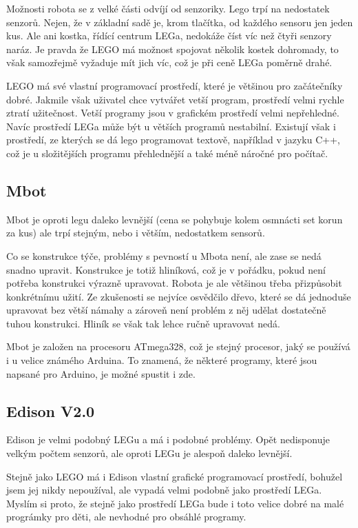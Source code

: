 \documentclass{template/socthesis}
\begin{document}
Možnosti robota se z velké části odvíjí od senzoriky. Lego trpí na nedostatek senzorů. Nejen, že v základní sadě je, krom tlačítka, od každého sensoru jen jeden kus. Ale ani kostka, řídící centrum LEGa, nedokáže číst víc než čtyři senzory naráz. Je pravda že LEGO má možnost spojovat několik kostek dohromady, to však samozřejmě vyžaduje mít jich víc, což je při ceně LEGa poměrně drahé.


LEGO má své vlastní programovací prostředí, které je většinou pro začátečníky dobré. Jakmile však uživatel chce vytvářet vetší program, prostředí velmi rychle ztratí užitečnost. Vetší programy jsou v grafickém prostředí velmi nepřehledné. Navíc prostředí LEGa může být u větších programů nestabilní. Existují však i prostředí, ze kterých se dá lego programovat textově, například v jazyku C++, což je u složitějších programu přehlednější a také méně náročné pro počítač.

\subsection{Mbot}
Mbot je oproti legu daleko levnější (cena se pohybuje kolem osmnácti set korun za kus) ale trpí stejným, nebo i větším, nedostatkem sensorů. 

Co se konstrukce týče, problémy s pevností u Mbota není, ale zase se nedá snadno upravit. Konstrukce je totiž hliníková, což je v pořádku, pokud není potřeba konstrukci výrazně upravovat. Robota je ale většinou třeba přizpůsobit konkrétnímu užití.
 Ze zkušenosti se nejvíce osvědčilo dřevo, které se dá jednoduše upravovat bez větší námahy a zároveň není problém z něj udělat dostatečně tuhou konstrukci. Hliník se však tak lehce ručně upravovat nedá.
 
Mbot je založen na procesoru ATmega328, což je stejný procesor, jaký se používá i u velice známého Arduina. %
To znamená, že některé programy, které jsou napsané pro Arduino, je možné spustit i zde.

\subsection{Edison V2.0}
Edison %
je velmi podobný LEGu a má i podobné problémy. Opět nedisponuje velkým počtem senzorů, ale oproti LEGu je alespoň daleko levnější. 

Stejně jako LEGO má i Edison vlastní grafické programovací prostředí, bohužel jsem jej nikdy nepoužíval, ale vypadá velmi podobně jako prostředí LEGa. Myslím si proto, že stejně jako prostředí LEGa bude i toto velice dobré na malé prográmky pro děti, ale nevhodné pro obsáhlé programy.
\end{document}
